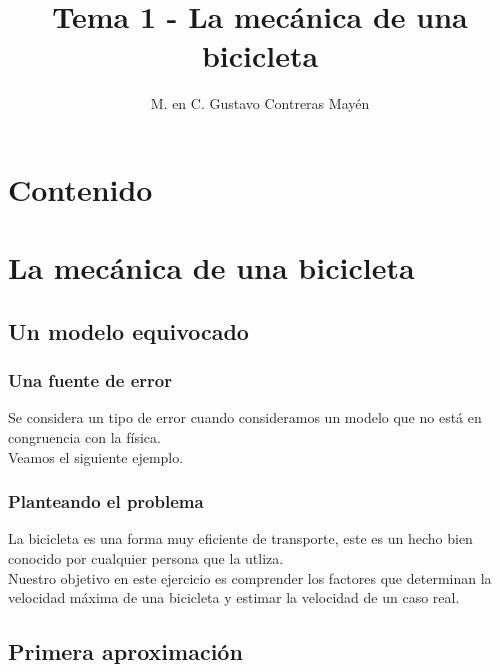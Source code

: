 \documentclass[12pt]{beamer}
\title{\large{Tema 1 - La mecánica de una bicicleta}}
\author{M. en C. Gustavo Contreras Mayén}
\date{ }
\begin{document}
\maketitle

\section*{Contenido}

\section{La mecánica de una bicicleta}
\subsection{Un modelo equivocado}

\begin{frame}
\frametitle{Una fuente de error}
Se considera un tipo de error cuando consideramos un modelo que no está en congruencia con la física.
\\
\bigskip
\pause
Veamos el siguiente ejemplo.
\end{frame}
\begin{frame}
\frametitle{Planteando el problema}
La bicicleta es una forma muy eficiente de transporte, este es un hecho bien conocido por cualquier persona que la utliza.
\\
\bigskip
\pause
Nuestro objetivo en este ejercicio es comprender los factores que determinan la velocidad máxima de una bicicleta y estimar la velocidad de un caso real.
\end{frame}

\subsection{Primera aproximación}
\end{document}
